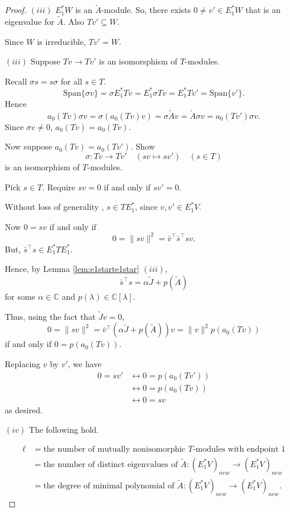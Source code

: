 \documentclass[
]{book}
\theoremstyle{definition}
\theoremstyle{definition}
\theoremstyle{definition}
\theoremstyle{definition}
\theoremstyle{remark}
\begin{document}
\begin{proof}
\((iii)\) \(E^*_1W\) is an \(\tilde{A}\)-module. So, there exists \(0\neq v'\in E^*_1W\) that is an eigenvalue for \(\tilde{A}\). Also \(Tv' \subseteq W\).

Since \(W\) is irreducible, \(Tv' = W\).

\((iii)\) Suppose \(Tv \to Tv'\) is an isomorsphism of \(T\)-modules.

Recall \(\sigma s = s\sigma\) for all \(s\in T\).
\[\mathrm{Span}\{\sigma v\} = \sigma E^*_1Tv = E^*_1\sigma Tv = E^*_1Tv' = \mathrm{Span}\{v'\}.\]
Hence
\[a_0(Tv)\sigma v = \sigma(a_0(Tv)v) = \sigma \tilde{A}v = \tilde{A}\sigma v = a_0(Tv')\sigma v.\]
Since \(\sigma v \neq 0\), \(a_0(Tv) = a_0(Tv)\).

Now suppose \(a_0(Tv)=a_0(Tv')\). Show
\[\sigma: Tv \to Tv' \quad (sv \mapsto sv') \quad (s\in T)\]
is an isomorphism of \(T\)-modules.

Pick \(s\in T\). Require
\(sv = 0\) if and only if \(sv' = 0\).

Without loss of generality , \(s\in TE^*_1\), since \(v, v'\in E^*_1V\).

Now \(0 = sv\) if and only if
\[0 = \|sv\|^2 = \bar{v}^\top \bar{s}^\top sv.\]
But, \(\bar{s}^\top s\in E^*_1TE^*_1\).

Hence, by Lemma \ref{lem:e1starte1star} \((iii)\),
\[\bar{s}^\top s = \alpha \tilde{J} + p(\tilde{A})\]
for some \(\alpha\in \mathbb{C}\) and \(p(\lambda)\in \mathbb{C}[\lambda]\).

Thus, using the fact that \(\tilde{J}v = 0\),
\[0 = \|sv\|^2 = \bar{v}^\top (\alpha\tilde{J}+p(\tilde{A}))v = \|v\|^2 p(a_0(Tv))\]
if and only if \(0 = p(a_0(Tv))\).

Replacing \(v\) by \(v'\), we have
\begin{align}
0 = sv' & \leftrightarrow 0 = p(a_0(Tv'))\\
& \leftrightarrow 0 = p(a_0(Tv))\\
& \leftrightarrow 0 = sv
\end{align}
as desired.

\((iv)\) The following hold.

\begin{align}
\ell & = \text{the number of mutually nonisomorphic $T$-modules with endpoint $1$}\\
& = \text{the number of distinct eigenvalues of $\tilde{A}:(E^*_1V)_{new}\to (E^*_1V)_{new}$}\\
& = \text{the degree of minimal polynomial of $\tilde{A}:(E^*_1V)_{new}\to (E^*_1V)_{new}$.}
\end{align}


\end{proof}
\end{document}
